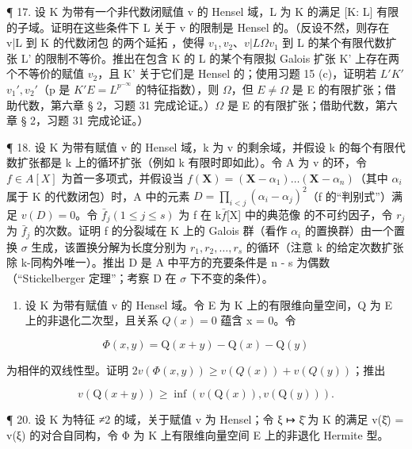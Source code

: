 ¶ 17. 设 K 为带有一个非代数闭赋值 v 的 Hensel 域，L 为 K 的满足 {[}K: L{]} 有限的子域。证明在这些条件下 L 关于 v 的限制是 Hensel 的。（反设不然，则存在 v|L 到 K 的代数闭包  的两个延拓 ，使得 \(v_{1}, v_{2}\)、\(v|L\)\(\Omega\)\(v_{1}\) 到 L 的某个有限代数扩张 L' 的限制不等价。推出在包含 K 的 L 的某个有限拟 Galois 扩张 K' 上存在两个不等价的赋值 \(v_{2}\)，且 K' 关于它们是 Hensel 的；使用习题 15 (c)，证明若 \(L'\)\(K'\)\(v_{1}', v_{2}'\)（p 是 \(K'\)\(E = L^{p^{-\infty}}\) 的特征指数），则 \(\Omega\)，但 \(E \neq \Omega\) 是 E 的有限扩张；借助代数，第六章 § 2，习题 31 完成论证。）\(\Omega\) 是 E 的有限扩张；借助代数，第六章 § 2，习题 31 完成论证。）

¶ 18. 设 K 为带有赋值 v 的 Hensel 域，k 为 v 的剩余域，并假设 k 的每个有限代数扩张都是 k 上的循环扩张（例如 k 有限时即如此）。令 A 为 v 的环，令 \(f \in A[X]\) 为首一多项式，并假设当 \(f(\mathbf{X}) = (\mathbf{X} - \alpha_{1}) \ldots (\mathbf{X} - \alpha_{n})\)（其中 \(\alpha_{i}\) 属于 K 的代数闭包）时，A 中的元素 \(D = \prod_{i < j} (\alpha_{i} - \alpha_{j})^{2}\)（f 的“判别式”）满足 \(v(D) = 0\)。令 \(\bar{f}_{j} (1 \leqslant j \leqslant s)\) 为 f 在 k\(\bar{f}\){[}X{]} 中的典范像  的不可约因子，令 \(r_{j}\) 为 \(\bar{f}_{j}\) 的次数。证明 f 的分裂域在 K 上的 Galois 群（看作 \(\alpha_{i}\) 的置换群）由一个置换 \(\sigma\) 生成，该置换分解为长度分别为 \(r_{1}, r_{2}, \ldots, r_{s}\) 的循环（注意 k 的给定次数扩张除 k-同构外唯一）。推出 D 是 A 中平方的充要条件是 n - s 为偶数（“Stickelberger 定理”；考察 D 在 \(\sigma\) 下不变的条件）。

\begin{enumerate}
\def\labelenumi{\arabic{enumi}.}
\setcounter{enumi}{18}
\tightlist
\item
  设 K 为带有赋值 v 的 Hensel 域。令 E 为 K 上的有限维向量空间，Q 为 E 上的非退化二次型，且关系 \(Q(x) = 0\) 蕴含 x = 0。令
\end{enumerate}

\[
\Phi (x, y) = \mathrm{Q} (x + y) - \mathrm{Q} (x) - \mathrm{Q} (y)
\]

为相伴的双线性型。证明 \(2v(\Phi(x,y)) \geqslant v(Q(x)) + v(Q(y))\)；推出

\[
v (\mathrm{Q} (x + y)) \geqslant \inf (v (\mathrm{Q} (x)), v (\mathrm{Q} (y))).
\]

¶ 20. 设 K 为特征 ≠2 的域，关于赋值 v 为 Hensel；令 ξ ↦ ξ̄ 为 K 的满足 v(ξ̄) = v(ξ) 的对合自同构，令 Φ 为 K 上有限维向量空间 E 上的非退化 Hermite 型。

